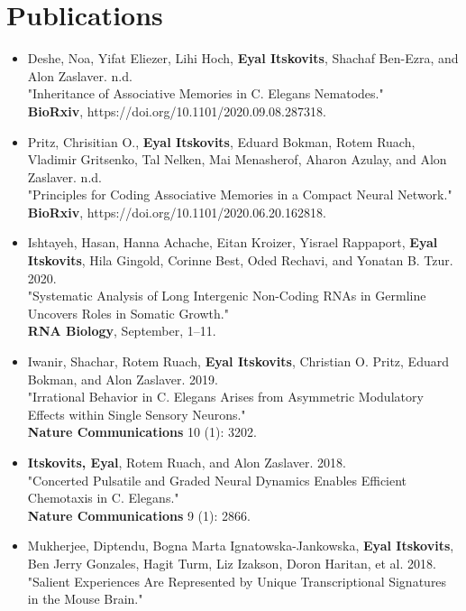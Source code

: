 \documentclass{tccv_Eyal}
\begin{document}
\section{Publications}
\begin{itemize}
    \item
    Deshe, Noa, Yifat Eliezer, Lihi Hoch, \textbf{Eyal Itskovits}, Shachaf Ben-Ezra, and Alon Zaslaver. n.d. \\
    "Inheritance of Associative Memories in C. Elegans Nematodes." \\
    \textbf{BioRxiv}, https://doi.org/10.1101/2020.09.08.287318.
    \item
    Pritz, Chrisitian O., \textbf{Eyal Itskovits}, Eduard Bokman, Rotem Ruach, Vladimir Gritsenko, Tal Nelken, Mai Menasherof, Aharon Azulay, and Alon Zaslaver. n.d. \\
    "Principles for Coding Associative Memories in a Compact Neural Network." \\
    \textbf{BioRxiv}, https://doi.org/10.1101/2020.06.20.162818.
    \item
    Ishtayeh, Hasan, Hanna Achache, Eitan Kroizer, Yisrael Rappaport, \textbf{Eyal Itskovits}, Hila Gingold, Corinne Best, Oded Rechavi, and Yonatan B. Tzur. 2020. \\
    "Systematic Analysis of Long Intergenic Non-Coding RNAs in Germline Uncovers Roles in Somatic Growth." \\
    \textbf{RNA Biology}, September, 1–11.
    \item
    Iwanir, Shachar, Rotem Ruach, \textbf{Eyal Itskovits}, Christian O. Pritz, Eduard Bokman, and Alon Zaslaver. 2019. \\ "Irrational Behavior in C. Elegans Arises from Asymmetric Modulatory Effects within Single Sensory Neurons." \\
    \textbf{Nature Communications} 10 (1): 3202.
    \item
    \textbf{Itskovits, Eyal}, Rotem Ruach, and Alon Zaslaver. 2018. \\
    "Concerted Pulsatile and Graded Neural Dynamics Enables Efficient Chemotaxis in C. Elegans." \\
    \textbf{Nature Communications} 9 (1): 2866.
    \item
    Mukherjee, Diptendu, Bogna Marta Ignatowska-Jankowska, \textbf{Eyal Itskovits}, Ben Jerry Gonzales, Hagit Turm, Liz Izakson, Doron Haritan, et al. 2018. \\
    "Salient Experiences Are Represented by Unique Transcriptional Signatures in the Mouse Brain." \\

\end{itemize}
\end{document}
